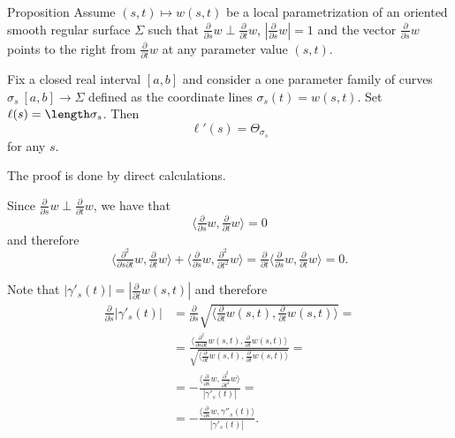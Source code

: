 \begin{thm}{Proposition}\label{prop:first-var}
Assume $(s,t)\mapsto w(s,t)$ be a local parametrization of an oriented smooth regular surface $\Sigma$ such that 
$\tfrac{\partial}{\partial s}w\perp \tfrac{\partial}{\partial t}w$, $|\tfrac{\partial}{\partial s}w|=1$ and the vector $\tfrac{\partial}{\partial s}w$ points to the right from $\tfrac{\partial}{\partial t}w$ at any parameter value $(s,t)$.

Fix a closed real interval $[a,b]$ and consider a one parameter family of curves $\sigma_s\:[a,b]\to \Sigma$  defined as the coordinate lines $\sigma_s(t)=w(s,t)$.
Set $\ell(s)=\length \sigma_s$.
Then
\[\ell'(s)=\Theta_{\sigma_s}\]
for any $s$.
\end{thm}

The proof is done by direct calculations.

Since $\tfrac{\partial}{\partial s}w\perp \tfrac{\partial}{\partial t}w$, we have that
\[\langle\tfrac{\partial}{\partial s}w, \tfrac{\partial}{\partial t}w\rangle=0\]
and therefore
\[\langle\tfrac{\partial^2}{\partial s\partial t}w, \tfrac{\partial}{\partial t}w\rangle
+\langle\tfrac{\partial}{\partial s}w, \tfrac{\partial^2}{\partial t^2}w\rangle=\tfrac{\partial}{\partial t}\langle\tfrac{\partial}{\partial s}w, \tfrac{\partial}{\partial t}w\rangle=0.\]

Note that $|\gamma'_s(t)|=|\tfrac{\partial}{\partial t}w(s,t)|$ and therefore
\begin{align*}
\tfrac \partial {\partial s}|\gamma'_s(t)|&=\tfrac \partial {\partial s}\sqrt{\langle \tfrac{\partial}{\partial t}w(s,t),\tfrac{\partial}{\partial t}w(s,t)\rangle}=
\\
&=\frac{\langle \tfrac{\partial^2}{\partial s\partial t}w(s,t),\tfrac{\partial}{\partial t}w(s,t)\rangle}{\sqrt{\langle \tfrac{\partial}{\partial t}w(s,t),\tfrac{\partial}{\partial t}w(s,t)\rangle}}=
\\
&=-\frac{\langle\tfrac{\partial}{\partial s}w, \tfrac{\partial^2}{\partial t^2}w\rangle}{|\gamma'_s(t)|}=
\\
&=-\frac{\langle\tfrac{\partial}{\partial s}w, \gamma''_s(t)\rangle}{|\gamma'_s(t)|}.
\end{align*}

